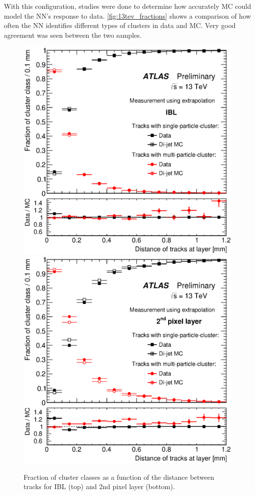 With this configuration, studies were done to determine how accurately \ac{MC} could model the \ac{NN}'s response to data. \autoref{fig:13tev_fractions} shows a comparison of how often the \ac{NN} identifies different types of clusters in data and \ac{MC}. Very good agreement was seen between the two samples.

\begin{centering}
\begin{figure}[bth]
\myfloatalign
\includegraphics[width=.9\linewidth]{figures/nn/fig_07a.eps}
\includegraphics[width=.9\linewidth]{figures/nn/fig_07b.eps}
\caption{Fraction of cluster classes as a function of the distance between tracks for IBL (top) and 2nd pixel layer (bottom).}
\label{fig:13tev_fractions}
\end{figure}
\end{centering}

